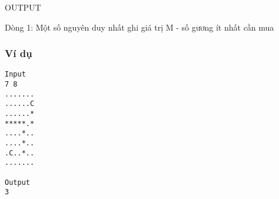 OUTPUT

Dòng 1: Một số nguyên duy nhất ghi giá trị M - số gương ít nhất cần mua

\subsubsection{Ví dụ}
\begin{verbatim}
Input
7 8
.......
......C
......*
*****.*
....*..
....*..
.C..*..
.......

Output
3
\end{verbatim}

 
